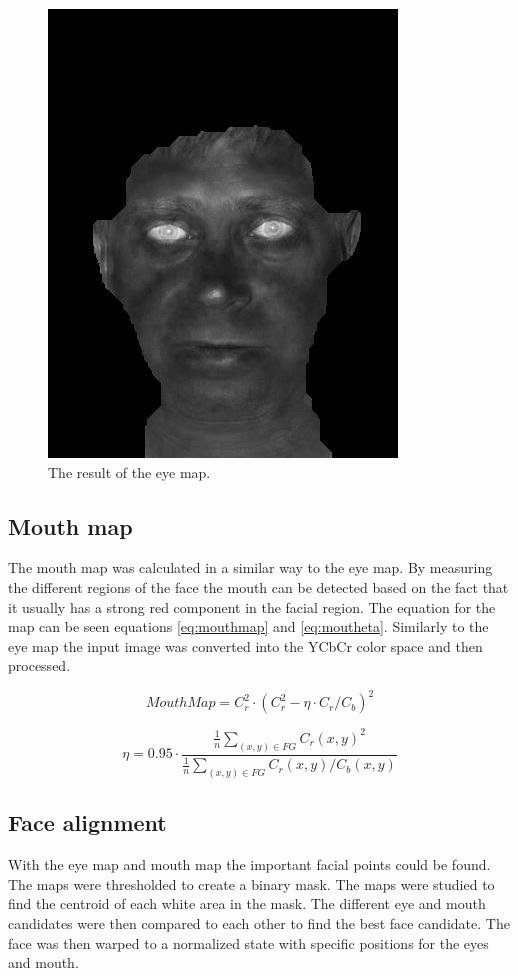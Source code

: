 \begin{figure}[htbp]
  \centering
  \includegraphics[width=0.6\columnwidth]{images/eye.jpg}
  \caption{The result of the eye map.}
  \label{fig:eyemap}
\end{figure}

\subsection{Mouth map}
The mouth map was calculated in a similar way to the eye map. By measuring the
different regions of the face the mouth can be detected based on the fact that
it usually has a strong red component in the facial region. The equation for
the map can be seen equations \ref{eq:mouthmap} and \ref{eq:moutheta}.
Similarly to the eye map the input image was converted into the YCbCr color
space and then processed.

\begin{equation}
  MouthMap = C_r^2 \cdot (C_r^2 - \eta \cdot C_r/C_b)^2
  \label{eq:mouthmap}
\end{equation}

\begin{equation}
  \eta = 0.95 \cdot \frac{\frac{1}{n}\sum_{(x,y)\in FG} C_r(x,y)^2}{\frac{1}{n}\sum_{(x,y)\in FG} C_r(x,y)/C_b(x,y)}
  \label{eq:moutheta}
\end{equation}

\subsection{Face alignment}
With the eye map and mouth map the important facial points could be found. The
maps were thresholded to create a binary mask. The maps were studied to find
the centroid of each white area in the mask. The different eye and mouth
candidates were then compared to each other to find the best face candidate.
The face was then warped to a normalized state with specific positions for the
eyes and mouth.

